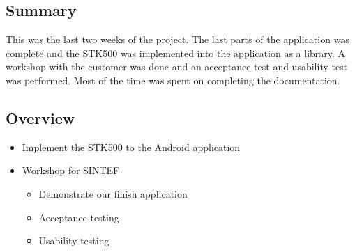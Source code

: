 \subsection{Summary}
	This was the last two weeks of the project. The last parts of the application was complete and the STK500 was implemented into the application as a library.
	A workshop with the customer was done and an acceptance test and usability test was performed. Most of the time was spent on completing the documentation.

\subsection{Overview}
\begin{itemize}
	\item{Implement the STK500 to the Android application}
	\item{Workshop for SINTEF}
		\begin{itemize}
		\item{Demonstrate our finish application}
		\item{Acceptance testing}
		\item{Usability testing}
	\end{itemize}
\end{itemize}